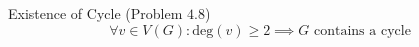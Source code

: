 
\begin{frame}{}
  \begin{exampleblock}{Existence of Cycle (Problem $4.8$)}
    \[
      \forall v \in V(G): \text{deg}(v) \ge 2 \implies G \text{ contains a cycle}
    \]
  \end{exampleblock}
\end{frame}

